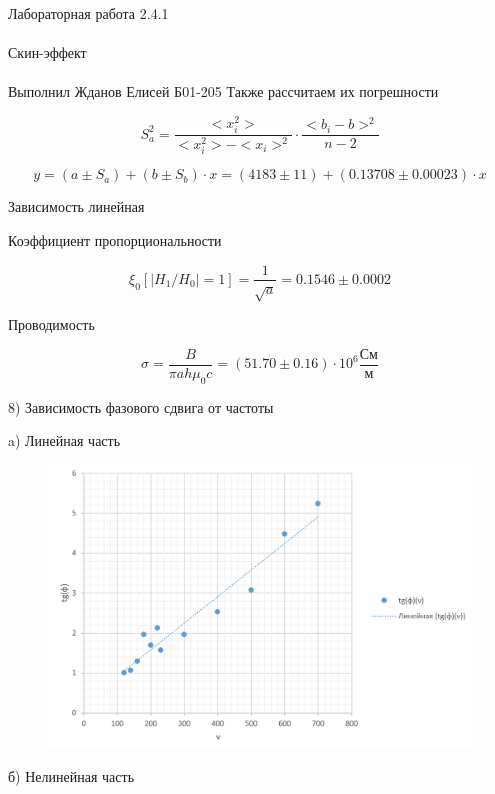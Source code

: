 \documentclass{astroedu-lab}
\begin{document}
\begin{problem}{\huge Лабораторная работа 2.4.1\\\\Скин-эффект\\\\Выполнил Жданов Елисей Б01-205}
Также рассчитаем их погрешности

\begin{equation}
	S_a^2 = \frac{< x_i^2>}{< x_i^2 > - < x_i >^2} \cdot \frac{<  b_i - b > ^2}{n - 2}
\end{equation}

\begin{equation}
	y = (a \pm S_a) + (b \pm S_b) \cdot x = (4183 \pm 11) + (0.13708 \pm 0.00023) \cdot x
\end{equation}

Зависимость линейная

Коэффициент пропорциональности

\begin{equation}
	\xi_0[|H_1/H_0| = 1] = \frac{1}{\sqrt{a}} = 0.1546 \pm 0.0002
\end{equation}

Проводимость

\begin{equation}
	\sigma = \frac{B}{\pi a h \mu_0 c} = (51.70 \pm 0.16) \cdot  10^6 \frac{\text{См}}{\text{м}}
\end{equation}

8) Зависимость фазового сдвига от частоты

\newpage

a) Линейная часть

\begin{figure}[!h]
	\centering
	\includegraphics[width=1\textwidth]{гр3.png}
	\label{fig:boiler}
\end{figure}

\newpage

б) Нелинейная часть


\end{problem}
\end{document}
